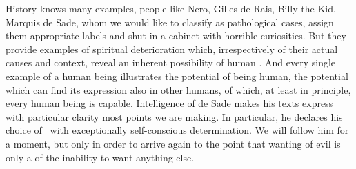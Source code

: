 \pa History knows many examples, people like Nero, Gilles de
Rais, Billy the Kid, Marquis de Sade, whom
we would like to classify as pathological cases, assign them appropriate labels
and shut in a cabinet with horrible curiosities.  But they provide examples of
spiritual deterioration which, irrespectively of their actual causes and
context, reveal an inherent possibility of human .  And every single
example of a human being illustrates the potential of being human, the potential
which can find its expression also in other humans, of which, at least in
principle, every human being is capable.
%
Intelligence of de Sade makes his texts express with particular clarity most
points we are making. In particular, he declares his choice of \No\ with
exceptionally self-conscious determination.  We will follow him for a moment,
but only in order to arrive again to the point that  wanting of evil
is only a  of the inability to want anything else.

